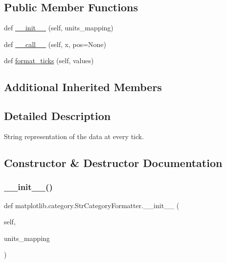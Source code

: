 \subsection*{Public Member Functions}
\begin{DoxyCompactItemize}
\item 
def \hyperlink{classmatplotlib_1_1category_1_1StrCategoryFormatter_a82fdebc16d711853822fde28820b8338}{\+\_\+\+\_\+init\+\_\+\+\_\+} (self, units\+\_\+mapping)
\item 
def \hyperlink{classmatplotlib_1_1category_1_1StrCategoryFormatter_a0cc9465fa4724e565c026dd14c8c125d}{\+\_\+\+\_\+call\+\_\+\+\_\+} (self, x, pos=None)
\item 
def \hyperlink{classmatplotlib_1_1category_1_1StrCategoryFormatter_a3d4c60f107c0b3afa66d02de58606b65}{format\+\_\+ticks} (self, values)
\end{DoxyCompactItemize}
\subsection*{Additional Inherited Members}


\subsection{Detailed Description}
\begin{DoxyVerb}String representation of the data at every tick.\end{DoxyVerb}
 

\subsection{Constructor \& Destructor Documentation}
\mbox{\label{classmatplotlib_1_1category_1_1StrCategoryFormatter_a82fdebc16d711853822fde28820b8338}} 
\subsubsection{\texorpdfstring{\+\_\+\+\_\+init\+\_\+\+\_\+()}{\_\_init\_\_()}}
{\footnotesize\ttfamily def matplotlib.\+category.\+Str\+Category\+Formatter.\+\_\+\+\_\+init\+\_\+\+\_\+ (\begin{DoxyParamCaption}\item[{}]{self,  }\item[{}]{units\+\_\+mapping }\end{DoxyParamCaption})}

